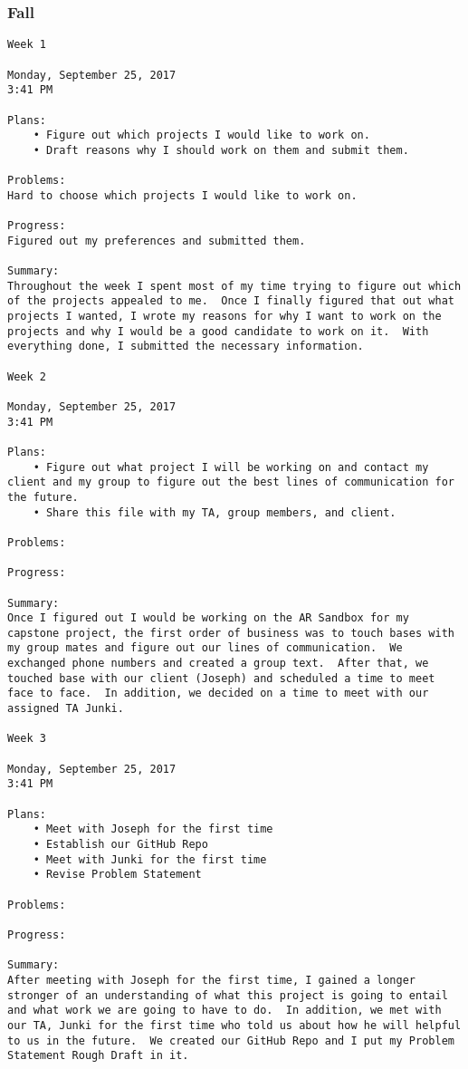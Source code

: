 \subsubsection{Fall}
\begin{lstlisting}
Week 1

Monday, September 25, 2017
3:41 PM

Plans:
	• Figure out which projects I would like to work on. 
	• Draft reasons why I should work on them and submit them.

Problems:
Hard to choose which projects I would like to work on.

Progress:
Figured out my preferences and submitted them.

Summary:
Throughout the week I spent most of my time trying to figure out which of the projects appealed to me.  Once I finally figured that out what projects I wanted, I wrote my reasons for why I want to work on the projects and why I would be a good candidate to work on it.  With everything done, I submitted the necessary information.

Week 2

Monday, September 25, 2017
3:41 PM

Plans:
	• Figure out what project I will be working on and contact my client and my group to figure out the best lines of communication for the future.  
	• Share this file with my TA, group members, and client.

Problems:

Progress:

Summary:
Once I figured out I would be working on the AR Sandbox for my capstone project, the first order of business was to touch bases with my group mates and figure out our lines of communication.  We exchanged phone numbers and created a group text.  After that, we touched base with our client (Joseph) and scheduled a time to meet face to face.  In addition, we decided on a time to meet with our assigned TA Junki.

Week 3

Monday, September 25, 2017
3:41 PM

Plans:
	• Meet with Joseph for the first time
	• Establish our GitHub Repo
	• Meet with Junki for the first time
	• Revise Problem Statement

Problems:

Progress:

Summary:
After meeting with Joseph for the first time, I gained a longer stronger of an understanding of what this project is going to entail and what work we are going to have to do.  In addition, we met with our TA, Junki for the first time who told us about how he will helpful to us in the future.  We created our GitHub Repo and I put my Problem Statement Rough Draft in it.


\end{lstlisting}
